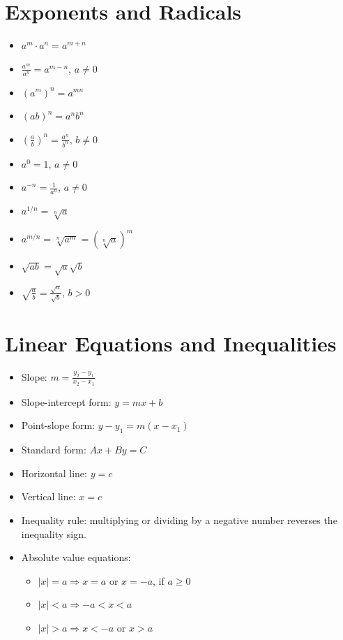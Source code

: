 \documentclass[11pt]{book}
\begin{document}
\section{Exponents and Radicals}

\begin{itemize}
\item \(a^m\cdot a^n=a^{m+n}\)
\item \(\frac{a^m}{a^n}=a^{m-n}\), \(a\ne0\)
\item \((a^m)^n=a^{mn}\)
\item \((ab)^n=a^nb^n\)
\item \(\left(\frac{a}{b}\right)^n=\frac{a^n}{b^n}\), \(b\ne0\)
\item \(a^0=1\), \(a\ne0\)
\item \(a^{-n}=\frac{1}{a^n}\), \(a\ne0\)
\item \(a^{1/n}=\sqrt[n]{a}\)
\item \(a^{m/n}=\sqrt[n]{a^m}=(\sqrt[n]{a})^m\)
\item \(\sqrt{ab}=\sqrt a\sqrt b\)
\item \(\sqrt{\frac{a}{b}}=\frac{\sqrt a}{\sqrt b}\), \(b>0\)
\end{itemize}

\section{Linear Equations and Inequalities}

\begin{itemize}
\item Slope: \(m=\frac{y_2-y_1}{x_2-x_1}\)
\item Slope-intercept form: \(y=mx+b\)
\item Point-slope form: \(y-y_1=m(x-x_1)\)
\item Standard form: \(Ax+By=C\)
\item Horizontal line: \(y=c\)
\item Vertical line: \(x=c\)
\item Inequality rule: multiplying or dividing by a negative number reverses the inequality sign.
\item Absolute value equations:
\begin{itemize}
\item \(|x|=a\Rightarrow x=a\) or \(x=-a\), if \(a\ge0\)
\item \(|x|<a\Rightarrow -a<x<a\)
\item \(|x|>a\Rightarrow x<-a\) or \(x>a\)
\end{itemize}
\end{itemize}
\end{document}
